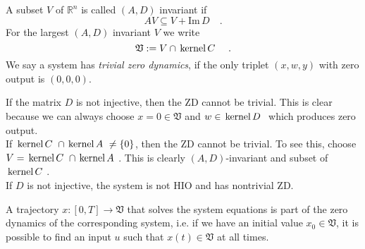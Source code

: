 \begin{definition}{}{}
	A subset $V$ of $\mathbb{R}^n$ is called $(A,D)$ invariant if
	\begin{equation}
	A V \subseteq V + \text{Im}\, D \quad .
	\end{equation}
	For the largest $(A,D)$ invariant $V$ we write
	\begin{equation}
	\mathfrak{V} := V \cap  \, \text{kernel}\,C \,\,\quad .
	\end{equation}
	We say a system has \textit{trivial zero dynamics}, if the only triplet $(x,w,y)$ with 
	zero output is $(0,0,0)$. 
\end{definition}
\begin{corollary}{}{}
	If the matrix $D$ is not injective, then the ZD cannot be trivial. This is 
	clear because we can always choose $x=0\in\mathfrak{V}$ and $w\in \, \text{kernel}\,D \,\,$ which 
	produces zero output.\\

	If $ \, \text{kernel}\,C \,\,\cap  \, \text{kernel}\,A \,\, \neq \{0\}$, then the ZD cannot be trivial. To see this, 
	choose $V= \, \text{kernel}\,C \,\,\cap  \, \text{kernel}\,A \,\,$. This is clearly $(A,D)$-invariant and subset of 
	$ \, \text{kernel}\,C \,\,$.	\\
	
	If $D$ is not injective, the system is not HIO and has nontrivial ZD.	
\end{corollary}
\begin{proposition}{}{}
	A trajectory $x:[0,T]\to \mathfrak{V}$ that solves the system 
	equations is part of the zero dynamics of the 
	corresponding system, i.e. if we have an initial value $x_0\in \mathfrak{V}$, it is 
	possible to find an input $u$ such that $x(t)\in\mathfrak{V}$ at all times.
\end{proposition}

